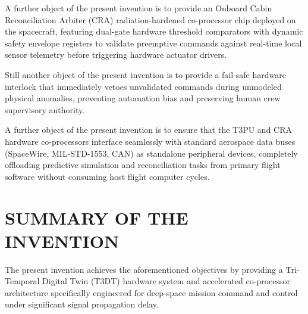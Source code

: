 \documentclass[12pt,a4paper]{article}
\begin{document}
A further object of the present invention is to provide an Onboard Cabin Reconciliation Arbiter (CRA) radiation-hardened co-processor chip deployed on the spacecraft, featuring dual-gate hardware threshold comparators with dynamic safety envelope registers to validate preemptive commands against real-time local sensor telemetry before triggering hardware actuator drivers.

Still another object of the present invention is to provide a fail-safe hardware interlock that immediately vetoes unvalidated commands during unmodeled physical anomalies, preventing automation bias and preserving human crew supervisory authority.

A further object of the present invention is to ensure that the T3PU and CRA hardware co-processors interface seamlessly with standard aerospace data buses (SpaceWire, MIL-STD-1553, CAN) as standalone peripheral devices, completely offloading predictive simulation and reconciliation tasks from primary flight software without consuming host flight computer cycles.

\section*{SUMMARY OF THE INVENTION}
The present invention achieves the aforementioned objectives by providing a Tri-Temporal Digital Twin (T3DT) hardware system and accelerated co-processor architecture specifically engineered for deep-space mission command and control under significant signal propagation delay.
\end{document}
